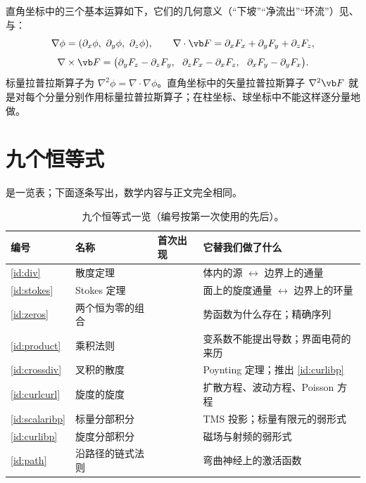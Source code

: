 直角坐标中的三个基本运算如下，它们的几何意义（“下坡”“净流出”“环流”）见、 与：
\begin{equation*}
\nabla\phi=(\partial_x\phi,\ \partial_y\phi,\ \partial_z\phi),\qquad
\nabla\cdot\vb F=\partial_xF_x+\partial_yF_y+\partial_zF_z,
\end{equation*}
\begin{equation*}
\nabla\times\vb F=\bigl(\partial_yF_z-\partial_zF_y,\ \ \partial_zF_x-\partial_xF_z,\ \ \partial_xF_y-\partial_yF_x\bigr).
\end{equation*}
标量拉普拉斯算子为 $\nabla^2\phi=\nabla\cdot\nabla\phi$。直角坐标中的矢量拉普拉斯算子 $\nabla^2\vb F$ 就是对每个分量分别作用标量拉普拉斯算子；在柱坐标、球坐标中不能这样逐分量地做。

\section{九个恒等式}\label{sec:app-nine}

 是一览表；下面逐条写出，数学内容与正文完全相同。

\begin{table}[htbp]\centering\small
\caption{九个恒等式一览（编号按第一次使用的先后）。}\label{tab:app-identities}
\begin{tabularx}{\linewidth}{@{}l >{\raggedright\arraybackslash}p{.2\linewidth} >{\raggedright\arraybackslash}p{.14\linewidth} Y@{}}
\toprule
编号 & 名称 & 首次出现 & 它替我们做了什么\\\midrule
\eqref{id:div} & 散度定理 &  & 体内的源 $\leftrightarrow$ 边界上的通量\\
\eqref{id:stokes} & Stokes 定理 &  & 面上的旋度通量 $\leftrightarrow$ 边界上的环量\\
\eqref{id:zeros} & 两个恒为零的组合 &  & 势函数为什么存在；精确序列\\
\eqref{id:product} & 乘积法则 &  & 变系数不能提出导数；界面电荷的来历\\
\eqref{id:crossdiv} & 叉积的散度 &  & Poynting 定理；推出 \eqref{id:curlibp}\\
\eqref{id:curlcurl} & 旋度的旋度 &  & 扩散方程、波动方程、Poisson 方程\\
\eqref{id:scalaribp} & 标量分部积分 &  & TMS 投影；标量有限元的弱形式\\
\eqref{id:curlibp} & 旋度分部积分 &  & 磁场与射频的弱形式\\
\eqref{id:path} & 沿路径的链式法则 &  & 弯曲神经上的激活函数\\
\bottomrule
\end{tabularx}
\end{table}

